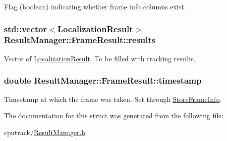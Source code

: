Flag (boolean) indicating whether frame info columns exist. 

\subsubsection[{\texorpdfstring{results}{results}}]{\setlength{\rightskip}{0pt plus 5cm}std\+::vector$<${\bf Localization\+Result}$>$ Result\+Manager\+::\+Frame\+Result\+::results}\hypertarget{struct_result_manager_1_1_frame_result_a090e9b69a382702cb7d551566d3bee76}{}\label{struct_result_manager_1_1_frame_result_a090e9b69a382702cb7d551566d3bee76}


Vector of \hyperlink{struct_localization_result}{Localization\+Result}. To be filled with tracking results. 

\subsubsection[{\texorpdfstring{timestamp}{timestamp}}]{\setlength{\rightskip}{0pt plus 5cm}double Result\+Manager\+::\+Frame\+Result\+::timestamp}\hypertarget{struct_result_manager_1_1_frame_result_a6ed8062b8120c1bb853f6d14d8b904e7}{}\label{struct_result_manager_1_1_frame_result_a6ed8062b8120c1bb853f6d14d8b904e7}


Timestamp at which the frame was taken. Set through \hyperlink{class_result_manager_a0bbedc935395c1af29f175f81ab063c9}{Store\+Frame\+Info}. 



The documentation for this struct was generated from the following file\+:\begin{DoxyCompactItemize}
\item 
cputrack/\hyperlink{_result_manager_8h}{Result\+Manager.\+h}\end{DoxyCompactItemize}
